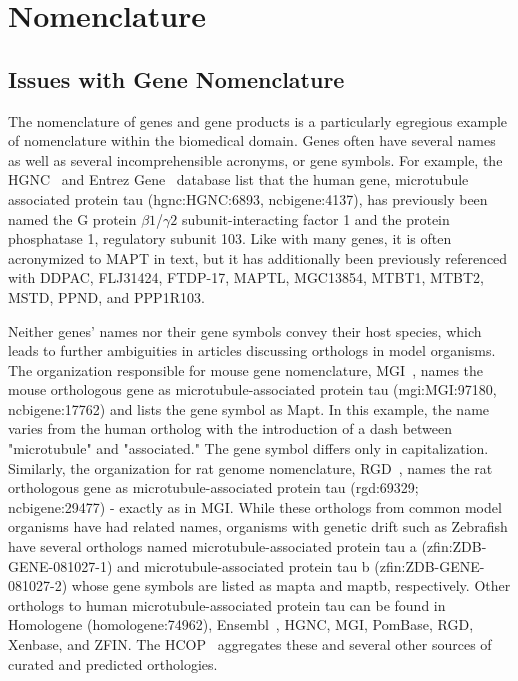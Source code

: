 \section{Nomenclature}

\subsection{Issues with Gene Nomenclature}

The nomenclature of genes and gene products is a particularly egregious example of nomenclature within the biomedical domain.
Genes often have several names as well as several incomprehensible acronyms, or gene symbols.
For example, the \ac{HGNC}~\cite{Yates2017} and Entrez Gene~\cite{Maglott2011} database list that the human gene, microtubule associated protein tau (hgnc:HGNC:6893, ncbigene:4137), has previously been named the G protein
$\beta1$/$\gamma2$ subunit-interacting factor 1 and the protein phosphatase 1,
regulatory subunit 103.
Like with many genes, it is often acronymized to MAPT in text, but it has additionally been previously referenced with DDPAC, FLJ31424, FTDP-17, MAPTL, MGC13854, MTBT1, MTBT2, MSTD, PPND, and PPP1R103.

Neither genes' names nor their gene symbols convey their host species, which leads to further ambiguities in articles discussing orthologs in model organisms.
The organization responsible for mouse gene nomenclature, \ac{MGI}~\cite{Blake2017}, names the mouse orthologous gene as microtubule-associated protein tau (mgi:MGI:97180, ncbigene:17762) and lists the gene symbol as Mapt.
In this example, the name varies from the human ortholog with the introduction of a dash between "microtubule" and "associated."
The gene symbol differs only in capitalization.
Similarly, the organization for rat genome nomenclature, \ac{RGD}~\cite{Shimoyama2015}, names the rat orthologous gene as microtubule-associated protein tau (rgd:69329; ncbigene:29477) - exactly as in \ac{MGI}.
While these orthologs from common model organisms have had related names, organisms with genetic drift such as Zebrafish have several orthologs named microtubule-associated protein tau a (zfin:ZDB-GENE-081027-1) and microtubule-associated protein tau b (zfin:ZDB-GENE-081027-2) whose gene symbols are listed as mapta and maptb, respectively.
Other orthologs to human microtubule-associated protein tau can be found in Homologene (homologene:74962), Ensembl~\cite{Zerbino2018}, \ac{HGNC}, \ac{MGI}, PomBase, \ac{RGD}, Xenbase, and \ac{ZFIN}.
The \ac{HCOP}~\cite{Wright2005} aggregates these and several other sources of curated and predicted orthologies.

